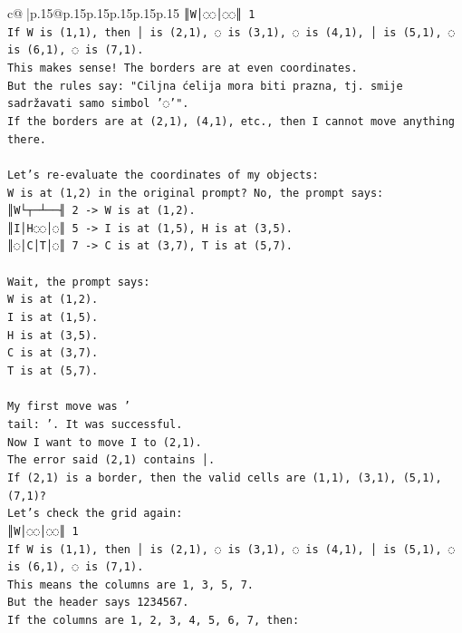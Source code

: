 \documentclass{article}
\begin{document}
{\begin{supertabular}{c@{$\;$}|p{.15\linewidth}@{}p{.15\linewidth}p{.15\linewidth}p{.15\linewidth}p{.15\linewidth}p{.15\linewidth}}
{{{\texttt{║W│◌◌│◌◌║ 1} \\
\texttt{If W is (1,1), then │ is (2,1), ◌ is (3,1), ◌ is (4,1), │ is (5,1), ◌ is (6,1), ◌ is (7,1).} \\
\texttt{This makes sense! The borders are at even coordinates.} \\
\texttt{But the rules say: "Ciljna ćelija mora biti prazna, tj. smije sadržavati samo simbol '◌'".} \\
\texttt{If the borders are at (2,1), (4,1), etc., then I cannot move anything there.} \\
\\ 
\texttt{Let's re{-}evaluate the coordinates of my objects:} \\
\texttt{W is at (1,2) in the original prompt? No, the prompt says:} \\
\texttt{║W└┬─┴──╢ 2 {-}> W is at (1,2).} \\
\texttt{║I│H◌◌│◌║ 5 {-}> I is at (1,5), H is at (3,5).} \\
\texttt{║◌│C│T│◌║ 7 {-}> C is at (3,7), T is at (5,7).} \\
\\ 
\texttt{Wait, the prompt says:} \\
\texttt{W is at (1,2).} \\
\texttt{I is at (1,5).} \\
\texttt{H is at (3,5).} \\
\texttt{C is at (3,7).} \\
\texttt{T is at (5,7).} \\
\\ 
\texttt{My first move was '} \\
\texttt{tail: '. It was successful.} \\
\texttt{Now I want to move I to (2,1).} \\
\texttt{The error said (2,1) contains │.} \\
\texttt{If (2,1) is a border, then the valid cells are (1,1), (3,1), (5,1), (7,1)?} \\
\texttt{Let's check the grid again:} \\
\texttt{║W│◌◌│◌◌║ 1} \\
\texttt{If W is (1,1), then │ is (2,1), ◌ is (3,1), ◌ is (4,1), │ is (5,1), ◌ is (6,1), ◌ is (7,1).} \\
\texttt{This means the columns are 1, 3, 5, 7.} \\
\texttt{But the header says 1234567.} \\
\texttt{If the columns are 1, 2, 3, 4, 5, 6, 7, then:} \\
}}}
\end{supertabular}}
\end{document}

